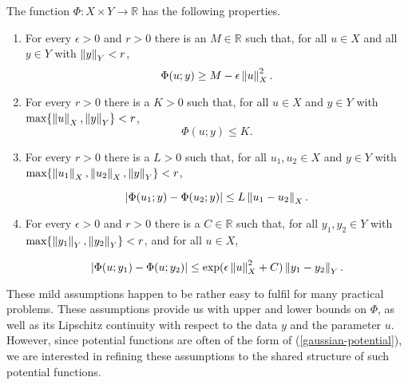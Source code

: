 \begin{assumption} \label{assumption-ll}
  The function $\Phi : X \times Y \rightarrow \mathbb{R}$ has the following properties.
  
  \begin{enumerate}
  \item For every $\epsilon > 0$ and $r > 0$ there is an $M \in \mathbb{R}$ such that, for all $u \in X$ and all $y \in Y$ with $\left\lVert y\right\rVert_Y < r$,
    \begin{equation*}
      \Phi(u; y) \ge M - \epsilon\left\lVert u\right\rVert_X^2.
    \end{equation*}
  \item For every $r > 0$ there is a $K > 0$ such that, for all $u \in X$ and $y \in Y$ with $\text{max}\{\left\lVert u\right\rVert_X, \left\lVert y\right\rVert_Y\} < r$,
    \begin{equation*}
      \Phi(u; y) \le K.
    \end{equation*}

  \item For every $r > 0$ there is a $L > 0$ such that, for all $u_1, u_2 \in X$ and $y \in Y$ with $\text{max}\{\left\lVert u_1\right\rVert_X, \left\lVert u_2\right\rVert_X, \left\lVert y\right\rVert_Y\} < r$,

    \begin{equation*}
      |\Phi(u_1; y) - \Phi(u_2; y)| \le L\left\lVert u_1 - u_2\right\rVert_X.
    \end{equation*}

  \item For every $\epsilon > 0$ and $r > 0$ there is a $C \in \mathbb{R}$ such that, for all $y_1, y_2 \in Y$ with $\text{max}\{\left\lVert y_1\right\rVert_Y, \left\lVert y_2\right\rVert_Y\} < r$, and for all $u \in X$,

    \begin{equation*}
      |\Phi(u; y_1) - \Phi(u; y_2)| \le \exp(\epsilon\left\lVert u\right\rVert_X^2 + C)\left\lVert y_1 - y_2\right\rVert_Y.
    \end{equation*}
  \end{enumerate}
\end{assumption}

These mild assumptions happen to be rather easy to fulfil for many practical problems. These assumptions provide us with upper and lower bounds on $\Phi$, as well as its Lipschitz continuity with respect to the data $y$ and the parameter $u$.  However, since potential functions are often of the form of (\ref{gaussian-potential}), we are interested in refining these assumptions to the shared structure of such potential functions.

